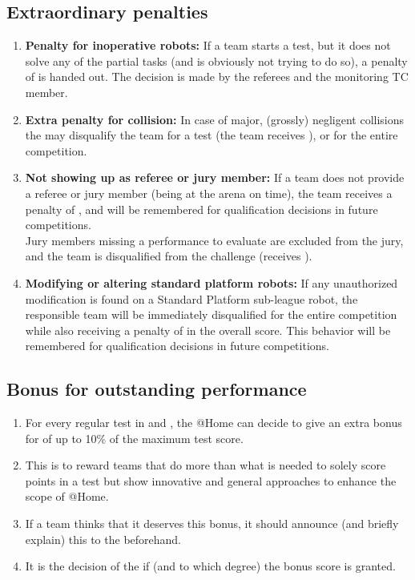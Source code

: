 \subsection{Extraordinary penalties}\label{rule:extraordinary_penalties}
\begin{enumerate}
	\item \textbf{Penalty for inoperative robots:} If a team starts a test, but it does not solve any of the partial tasks (and is obviously not trying to do so), a penalty of  is handed out. The decision is made by the referees and the monitoring TC member.  
	\item \textbf{Extra penalty for collision:} In case of major, (grossly) negligent collisions the  may disqualify the team for a test (the team receives ), or for the entire competition.
	\item \textbf{Not showing up as referee or jury member:} If a team does not provide a referee or jury member (being at the arena on time), the team receives a penalty of , and will be remembered for qualification decisions in future competitions.\\
	Jury members missing a performance to evaluate are excluded from the jury, and the team is disqualified from the challenge (receives ).
	\item \textbf{Modifying or altering standard platform robots:} If any unauthorized modification is found on a Standard Platform sub-league robot, the responsible team will be immediately disqualified for the entire competition while also receiving a penalty of  in the overall score. This behavior will be remembered for qualification decisions in future competitions.\\
\end{enumerate}

\subsection{Bonus for outstanding performance}\label{rule:outstanding_performance}
\begin{enumerate}
	\item For every regular test in  and , the @Home  can decide to give an extra bonus for  of up to 10\% of the maximum test score. 
	\item This is to reward teams that do more than what is needed to solely score points in a test but show innovative and general approaches to enhance the scope of @Home. 
	\item If a team thinks that it deserves this bonus, it should announce (and briefly explain) this to the  beforehand.
	\item It is the decision of the  if (and to which degree) the bonus score is granted.
\end{enumerate}



